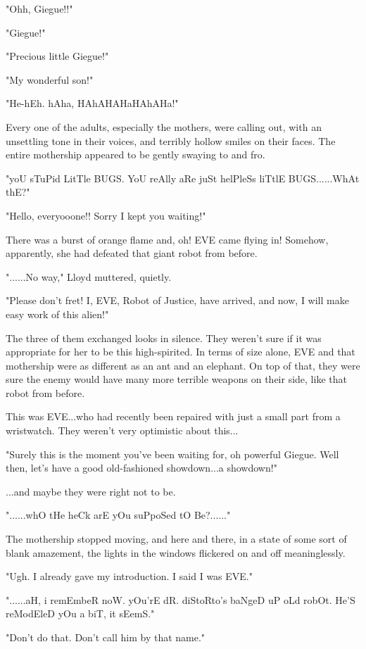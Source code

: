 \documentclass[
]{article}
\begin{document}
"Ohh, Giegue!!"

"Giegue!"

"Precious little Giegue!"

"My wonderful son!"

"He-hEh. hAha, HAhAHAHaHAhAHa!"

Every one of the adults, especially the mothers, were calling out, with
an unsettling tone in their voices, and terribly hollow smiles on their
faces. The entire mothership appeared to be gently swaying to and fro.

"yoU sTuPid LitTle BUGS. YoU reAlly aRe juSt helPleSs liTtlE
BUGS......WhAt thE?"

"Hello, everyooone!! Sorry I kept you waiting!"

There was a burst of orange flame and, oh! EVE came flying in! Somehow,
apparently, she had defeated that giant robot from before.

"......No way," Lloyd muttered, quietly.

"Please don't fret! I, EVE, Robot of Justice, have arrived, and now, I
will make easy work of this alien!"

The three of them exchanged looks in silence. They weren't sure if it
was appropriate for her to be this high-spirited. In terms of size
alone, EVE and that mothership were as different as an ant and an
elephant. On top of that, they were sure the enemy would have many more
terrible weapons on their side, like that robot from before.

This was EVE...who had recently been repaired with just a small part
from a wristwatch. They weren't very optimistic about this...

"Surely this is the moment you've been waiting for, oh powerful Giegue.
Well then, let's have a good old-fashioned showdown...a showdown!"

...and maybe they were right not to be.

"......whO tHe heCk arE yOu suPpoSed tO Be?......"

The mothership stopped moving, and here and there, in a state of some
sort of blank amazement, the lights in the windows flickered on and off
meaninglessly.

"Ugh. I already gave my introduction. I said I was EVE."

"......aH, i remEmbeR noW. yOu'rE dR. diStoRto's baNgeD uP oLd robOt.
He'S reModEleD yOu a biT, it sEemS."

"Don't do that. Don't call him by that name."
\end{document}
